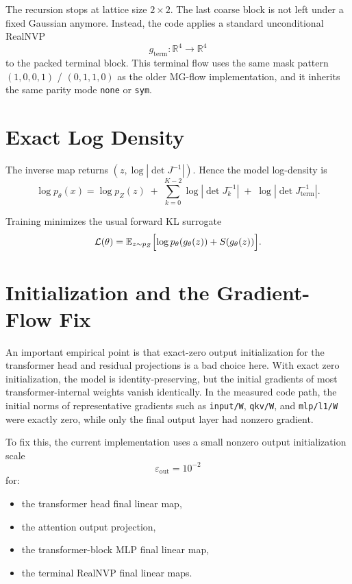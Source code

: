 \documentclass[11pt]{article}
\begin{document}
The recursion stops at lattice size $2\times 2$. The last coarse block is not
left under a fixed Gaussian anymore. Instead, the code applies a standard
unconditional RealNVP
\begin{equation}
g_{\mathrm{term}}:\mathbb{R}^4\to\mathbb{R}^4
\end{equation}
to the packed terminal block. This terminal flow uses the same mask pattern
$(1,0,0,1)$ / $(0,1,1,0)$ as the older MG-flow implementation, and it inherits
the same parity mode \texttt{none} or \texttt{sym}.

\section{Exact Log Density}

The inverse map returns $(z,\log |\det J^{-1}|)$. Hence the model log-density
is
\begin{equation}
\log p_\theta(x)
=
\log p_Z(z)
\;+\;
\sum_{k=0}^{K-2}\log \left|\det J_k^{-1}\right|
\;+\;
\log \left|\det J_{\mathrm{term}}^{-1}\right|.
\end{equation}

Training minimizes the usual forward KL surrogate
\begin{equation}
\mathcal L(\theta)
=
\mathbb E_{z\sim p_Z}\Bigl[
\log p_\theta(g_\theta(z)) + S(g_\theta(z))
\Bigr].
\end{equation}

\section{Initialization and the Gradient-Flow Fix}

An important empirical point is that exact-zero output initialization for the
transformer head and residual projections is a bad choice here. With exact zero
initialization, the model is identity-preserving, but the initial gradients of
most transformer-internal weights vanish identically. In the measured code path,
the initial norms of representative gradients such as
\texttt{input/W}, \texttt{qkv/W}, and \texttt{mlp/l1/W} were exactly zero, while
only the final output layer had nonzero gradient.

To fix this, the current implementation uses a small nonzero output
initialization scale
\begin{equation}
\varepsilon_{\mathrm{out}} = 10^{-2}
\end{equation}
for:
\begin{itemize}
\item the transformer head final linear map,
\item the attention output projection,
\item the transformer-block MLP final linear map,
\item the terminal RealNVP final linear maps.
\end{itemize}
\end{document}
